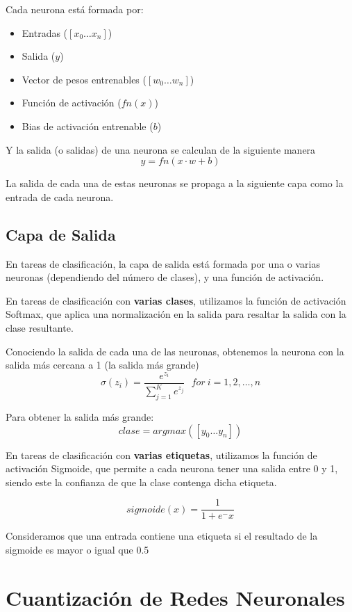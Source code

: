 Cada neurona está formada por:

\begin{itemize}
\item
  Entradas ($[x_0 \dots x_n]$)
\item
  Salida  ($y$)
\item
  Vector de pesos entrenables ($[w_0 \dots w_n]$)
\item
  Función de activación ($fn(x)$)
\item
  Bias de activación entrenable ($b$)
\end{itemize}

Y la salida (o salidas) de una neurona se calculan de la siguiente manera
$$
    y = fn(x \cdot w + b)
$$

La salida de cada una de estas neuronas se propaga a la siguiente capa como la entrada de cada neurona.

\hypertarget{capa-de-salida}{%
\subsection{Capa de Salida}\label{capa-de-salida}}

En tareas de clasificación, la capa de salida está formada por una o
varias neuronas (dependiendo del número de clases), y una función de
activación.

En tareas de clasificación con \textbf{varias clases}, utilizamos la
función de activación Softmax, que aplica una normalización en la salida
para resaltar la salida con la clase resultante.

Conociendo la salida de cada una de las neuronas, obtenemos la neurona
con la salida más cercana a 1 (la salida más grande)
$$
\sigma(z_i) = \frac{e^{z_{i}}}{\sum_{j=1}^K e^{z_{j}}} \ \ \ for\ i=1,2,\dots,n
$$

Para obtener la salida más grande:
$$clase = argmax([y_0 \dots y_n])$$


En tareas de clasificación con \textbf{varias etiquetas}, utilizamos la
función de activación Sigmoide, que permite a cada neurona tener una
salida entre 0 y 1, siendo este la confianza de que la clase contenga
dicha etiqueta.

$$ sigmoide(x) =  \frac{\mathrm{1} }{\mathrm{1} + e^-x }  $$ 

Consideramos que una entrada contiene una etiqueta si el resultado de la sigmoide es mayor o igual que 0.5


\hypertarget{cuantizacion-de-redes-neuronales}{%
\section{Cuantización de Redes
Neuronales}\label{cuantizacion-de-redes-neuronales}}

